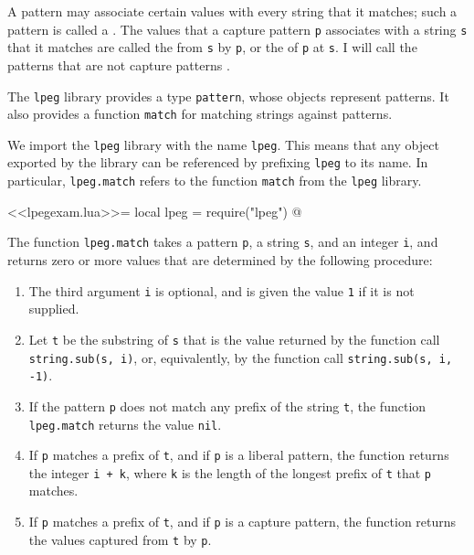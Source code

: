 \documentclass{article}
\begin{document}
A pattern may associate certain values with every string that it
matches; such a pattern is called a .  The
values that a capture pattern \verb|p| associates with a string
\verb|s| that it matches are called the 
from \verb|s| by \verb|p|, or the  of
\verb|p| at \verb|s|.  I will call the patterns that are not capture
patterns .

The \verb|lpeg| library provides a type \verb|pattern|, whose objects
represent patterns.  It also provides a function \verb|match| for
matching strings against patterns.

We import the \verb|lpeg| library with the name \verb|lpeg|.  This
means that any object exported by the library can be referenced by
prefixing \verb|lpeg| to its name.  In particular, \verb|lpeg.match|
refers to the function \verb|match| from the \verb|lpeg| library.
\begin{codechunk}
<<lpegexam.lua>>=
local lpeg = require("lpeg")
@
\end{codechunk}

The function \verb|lpeg.match| takes a pattern \verb|p|, a string
\verb|s|, and an integer \verb|i|, and returns zero or more values
that are determined by the following procedure:
\begin{enumerate}
\item The third argument \verb|i| is optional, and is given the value
  \verb|1| if it is not supplied.
\item Let \verb|t| be the substring of \verb|s| that is the value
  returned by the function call \verb|string.sub(s, i)|, or,
  equivalently, by the function call \verb|string.sub(s, i, -1)|.
\item If the pattern \verb|p| does not match any prefix of the string
  \verb|t|, the function \verb|lpeg.match| returns the value
  \verb|nil|.
\item If \verb|p| matches a prefix of \verb|t|, and if \verb|p| is a
  liberal pattern, the function returns the integer \verb|i + k|,
  where \verb|k| is the length of the longest prefix of \verb|t| that
  \verb|p| matches.
\item If \verb|p| matches a prefix of \verb|t|, and if \verb|p| is a
  capture pattern, the function returns the values captured from
  \verb|t| by \verb|p|.
\end{enumerate}
\end{document}
